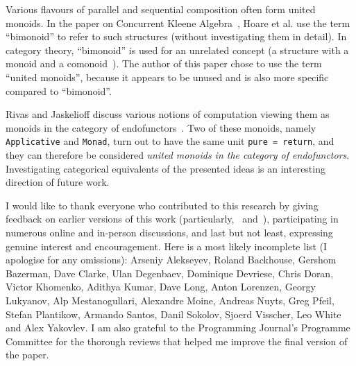 \documentclass[crc,english]{programming}
\newcommand{\hcode}[1]{{\color{darkblue} \lstinline[keywordstyle={}]|#1|}} %
\begin{document}
Various flavours of parallel and sequential composition often form united
monoids. In the paper on Concurrent Kleene Algebra~\cite{hoare2011concurrent},
Hoare et al. use the term ``bimonoid'' to refer to such structures (without
investigating them in detail). In category theory, ``bimonoid'' is used for an
unrelated concept (a structure with a monoid and a
comonoid~\cite{porst_bimonoids}). The author of this paper chose to use the term
``united monoids'', because it appears to be unused and is also more specific
compared to ``bimonoid''.

Rivas and Jaskelioff discuss various notions of computation viewing them as
monoids in the category of endofunctors~\cite{rivas_jaskelioff_2017}. Two of
these monoids, namely \hcode{Applicative} and \hcode{Monad}, turn out to have
the same unit \hcode{pure = return}, and they can therefore be considered
\emph{united monoids in the category of endofunctors}. Investigating categorical
equivalents of the presented ideas is an interesting direction of future work.

\acks
I would like to thank everyone who contributed to this research by giving
feedback on earlier versions of this work (particularly,~\cite{mokhov_alga}
and~\cite{united_monoids_blog}), participating in numerous online and
in-person discussions, and last but not least, expressing genuine interest and
encouragement.
Here is a most likely incomplete list (I apologise for any omissions):
Arseniy Alekseyev, Roland Backhouse, Gershom Bazerman, Dave Clarke,
Ulan Degenbaev, Dominique Devriese, Chris Doran, Victor Khomenko, Adithya Kumar,
Dave Long, Anton Lorenzen, Georgy Lukyanov, Alp Mestanogullari, Alexandre Moine,
Andreas Nuyts, Greg Pfeil, Stefan Plantikow, Armando Santos, Danil Sokolov,
Sjoerd Visscher, Leo White and Alex Yakovlev. I am also grateful to the
Programming Journal's Programme Committee for the thorough reviews that helped
me improve the final version of the paper.

\newpage
\printbibliography
\end{document}
